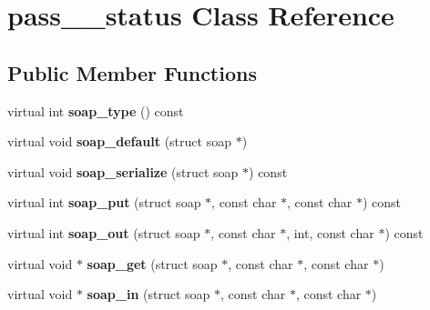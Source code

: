 \hypertarget{classpass____status}{
\section{pass\_\-\_\-status Class Reference}
\label{classpass____status}
}
\subsection*{Public Member Functions}
\begin{DoxyCompactItemize}
\item 
\hypertarget{classpass____status_ad05296ff579b3cc47b852651b4e91027}{
virtual int {\bfseries soap\_\-type} () const }
\label{classpass____status_ad05296ff579b3cc47b852651b4e91027}

\item 
\hypertarget{classpass____status_a54f949515a099c5ff6955704580fa6a7}{
virtual void {\bfseries soap\_\-default} (struct soap $\ast$)}
\label{classpass____status_a54f949515a099c5ff6955704580fa6a7}

\item 
\hypertarget{classpass____status_aa2bbded0e38d5f8511eaeb38689365f0}{
virtual void {\bfseries soap\_\-serialize} (struct soap $\ast$) const }
\label{classpass____status_aa2bbded0e38d5f8511eaeb38689365f0}

\item 
\hypertarget{classpass____status_a777c11c2fcef114bfcf0cd3e523f73de}{
virtual int {\bfseries soap\_\-put} (struct soap $\ast$, const char $\ast$, const char $\ast$) const }
\label{classpass____status_a777c11c2fcef114bfcf0cd3e523f73de}

\item 
\hypertarget{classpass____status_a9d31fe761a7c810db1d02d08b95b6ebd}{
virtual int {\bfseries soap\_\-out} (struct soap $\ast$, const char $\ast$, int, const char $\ast$) const }
\label{classpass____status_a9d31fe761a7c810db1d02d08b95b6ebd}

\item 
\hypertarget{classpass____status_a15103c19f04c7870cbac894e3c0acda5}{
virtual void $\ast$ {\bfseries soap\_\-get} (struct soap $\ast$, const char $\ast$, const char $\ast$)}
\label{classpass____status_a15103c19f04c7870cbac894e3c0acda5}

\item 
\hypertarget{classpass____status_a0d137c72bc9b8d4e0b1c05f1cfde5545}{
virtual void $\ast$ {\bfseries soap\_\-in} (struct soap $\ast$, const char $\ast$, const char $\ast$)}
\label{classpass____status_a0d137c72bc9b8d4e0b1c05f1cfde5545}

\end{DoxyCompactItemize}
